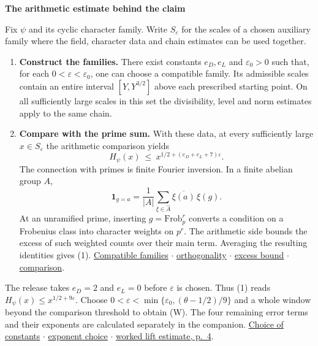 \documentclass[11pt,letterpaper]{article}
\newcommand{\heading}[1]{{\sffamily\bfseries\fontsize{22}{25}\selectfont #1\par}\vspace{3pt}}
\newcommand{\subhead}[1]{\par\addvspace{5pt}{\sffamily\bfseries\large\color{accent}#1\par}\nobreak\vspace{-2pt}}
\newcommand{\notes}[1]{{\small\sffamily\color{muted}#1}}
\newcommand{\repobase}{https://github.com/TomasOrtega/RH/blob/a6ac91a412dcbaab31801355ec5707024a71bf65/extracted/lean/src/}
\newcommand{\src}[3]{\href{\repobase#1.lean\#L#2}{#3}}
\newcommand{\chars}{Development/AutomorphicArithmetic/CharacterBoxes/}
\newcommand{\prim}{Development/AutomorphicArithmetic/PrimitiveCosets/}
\newcommand{\landau}{Development/AutomorphicArithmetic/DedekindLFunctions/LandauTheorems/}
\newcommand{\frames}{Formalism/SharpRestriction/RamificationFrobenius/TotientGaloisClasses/}
\begin{document}
\newpage
{}
\heading{The arithmetic estimate behind the claim}
\subhead{Two inputs must hold at the same scales}
Fix $\psi$ and its cyclic character family. Write $S_\varepsilon$ for the scales of a chosen auxiliary family where the field, character data and chain estimates can be used together.
\begin{enumerate}
\item \textbf{Construct the families.} There exist constants $e_D,e_L$ and $\varepsilon_0>0$ such that, for each $0<\varepsilon<\varepsilon_0$, one can choose a compatible family. Its admissible scales contain an entire interval $[Y,Y^{3/2}]$ above each prescribed starting point. On all sufficiently large scales in this set the divisibility, level and norm estimates apply to the same chain.
\item \textbf{Compare with the prime sum.} With these data, at every sufficiently large $x\in S_\varepsilon$ the arithmetic comparison yields
\[
                      H_\psi(x)\ \leq\ x^{1/2+(e_D+e_L+7)\varepsilon}. \tag{1}
\]
The connection with primes is finite Fourier inversion. In a finite abelian group $A$,
\[
  \mathbf1_{g=a}=\frac1{|A|}\sum_{\xi\in\widehat A}\overline{\xi(a)}\,\xi(g).
\]
At an unramified prime, inserting $g=\mathrm{Frob}_p^r$ converts a condition on a Frobenius class into character weights on $p^r$. The arithmetic side bounds the excess of such weighted counts over their main term. Averaging the resulting identities gives (1). \notes{\src{\chars ZeroFreeAllOfTopG}{12}{Compatible families} $\cdot$ \src{\landau ChBalance}{42}{orthogonality} $\cdot$ \src{\landau ChTop}{37}{excess bound} $\cdot$ \src{\prim CoreGm}{12}{comparison}.}
\end{enumerate}
The release takes $e_D=2$ and $e_L=0$ before $\varepsilon$ is chosen. Thus (1) reads $H_\psi(x)\le x^{1/2+9\varepsilon}$. Choose $0<\varepsilon<\min\{\varepsilon_0,(\theta-1/2)/9\}$ and a whole window beyond the comparison threshold to obtain (W). The four remaining error terms and their exponents are calculated separately in the companion. \notes{\src{Development/AutomorphicArithmetic/ThetaCorrespondence/ThetaPairLifts/ThirdPlaceSeries/TopShape}{52}{Choice of constants} $\cdot$ \src{\frames TopWin}{68}{exponent choice} $\cdot$ \href{https://github.com/robbiemu/dirichlet-grh-sketch/blob/main/lift-estimate.pdf}{worked lift estimate, p.\ 4}.}
\end{document}
